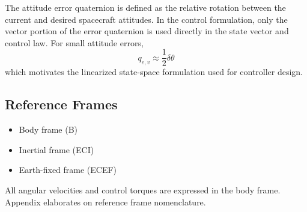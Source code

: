 The attitude error quaternion is defined as the relative rotation between the current and desired spacecraft attitudes. In the control formulation, only the vector portion of the error quaternion is used directly in the state vector and control law. For small attitude errors,
\[
q_{e,v} \approx \frac{1}{2}\delta\theta
\]
which motivates the linearized state-space formulation used for controller design.

\subsection{Reference Frames}

\begin{itemize}
	\item Body frame (B)
	\item Inertial frame (ECI)
	\item Earth-fixed frame (ECEF)
\end{itemize}

All angular velocities and control torques are expressed in the body frame. Appendix elaborates on reference frame nomenclature.